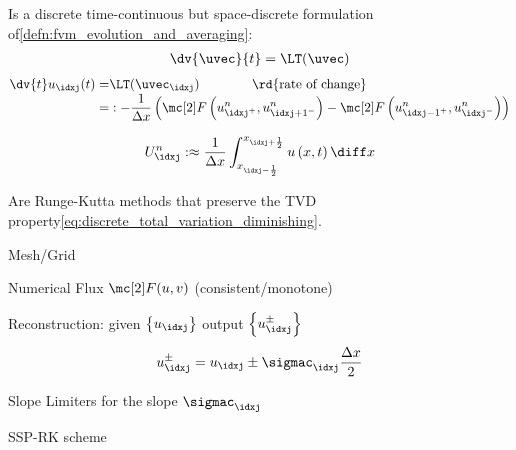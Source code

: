 \begin{defnbox}\nospacing
    \begin{defn}\label{defn:semi_discrete_fvm}
        Is a discrete time-continuous but space-discrete formulation of\cref{defn:fvm_evolution_and_averaging}:
        \begin{align}
          \dv{\uvec}{t}=\LT(\uvec)
        \end{align}
        \begin{align}
          \dv{t}u_{\idxj}(t)=&\LT(\uvec_{\idxj})\qquad\qquad\text{\rd{rate of change}}\label{eq:evolution_and_averaging}\\[-1\jot]
          =&:-\frac{1}{\Delta x} \left(\Flux \left(u_{\idxj^{+}}^{n},u_{{\idxj+1}^{-}}^{n}\right)- \Flux \left(u_{{\idxj-1}^{+}}^{n},u_{{\idxj}^{-}}^{n}\right) \right)\nonumber
        \end{align}
    \end{defn}
\end{defnbox}
\begin{defnbox}\nospacing
    \begin{defn}\label{defn:cell_averages_semi_discrete}\leavevmode
      \begin{align}
        U_{\idxj}^{n}:\approx\frac{1}{\Delta x}\int_{x_{\idxj-\frac{1}{2}}}^{x_{\idxj+\frac{1}{2}}}u\left(x,t\right)\diff x
      \end{align}
    \end{defn}
\end{defnbox}
\begin{defnbox}\nospacing
    \begin{defn}\label{defn:s_runge-kutta_methods}
        Are Runge-Kutta methods that preserve the TVD property\cref{eq:discrete_total_variation_diminishing}.
    \end{defn}
\end{defnbox}
\begin{sectionbox}\nospacing
    \begin{circlelistnosep}
        \item Mesh/Grid
        \item Numerical Flux $\Flux(u,v)$ (consistent/monotone)
        \item Reconstruction: given $\left\{u_{\idxj}\right\}$ output $\left\{u_{\idxj}^{\pm}\right\}$
        \begin{align*}
          u_{\idxj}^{\pm}=u_{\idxj}\pm\sigmac_{\idxj}\frac{\Delta x}{2}
        \end{align*}
        \item Slope Limiters for the slope $\sigmac_{\idxj}$
        \item SSP-RK scheme
    \end{circlelistnosep}
\end{sectionbox}

